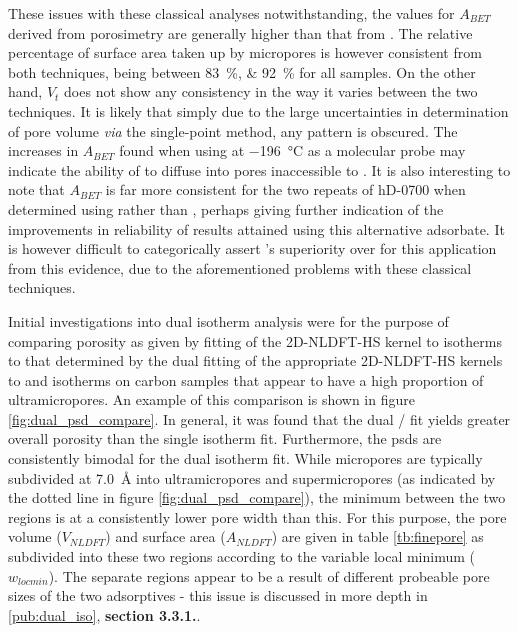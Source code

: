 These issues with these classical analyses notwithstanding, the values for $A_{BET}$ derived from  porosimetry are generally higher than that from . The relative percentage of surface area taken up by \glspl{micropore} is however consistent from both techniques, being between \qtylist[list-units=single]{83;92}{\percent} for all samples. On the other hand, $V_t$ does not show any consistency in the way it varies between the two techniques. It is likely that simply due to the large uncertainties in determination of pore volume \textit{via} the single-point method, any pattern is obscured. The increases in $A_{BET}$ found when using  at \qty{-196}{\degreeCelsius} as a molecular probe may indicate the ability of  to diffuse into pores inaccessible to . It is also interesting to note that $A_{BET}$ is far more consistent for the two repeats of hD-0700 when determined using  rather than , perhaps giving further indication of the improvements in reliability of results attained using this alternative \gls{adsorbate}. It is however difficult to categorically assert 's superiority over  for this application from this evidence, due to the aforementioned problems with these classical techniques. 
%

Initial investigations into dual isotherm analysis were for the purpose of comparing porosity as given by fitting of the 2D-NLDFT-HS kernel to  isotherms to that determined by the dual fitting of the appropriate 2D-NLDFT-HS kernels to  and  isotherms on carbon samples that appear to have a high proportion of \glspl{ultramicropore}. An example of this comparison is shown in figure \ref{fig:dual_psd_compare}. In general, it was found that the dual / fit yields greater overall porosity than the single isotherm fit. Furthermore, the \acrshort{psd}s are consistently bimodal for the dual isotherm fit. While \glspl{micropore} are typically subdivided at \qty{7.0}{\angstrom} into \glspl{ultramicropore} and \glspl{supermicropore} (as indicated by the dotted line in figure \ref{fig:dual_psd_compare}), the minimum between the two regions is at a consistently lower pore width than this. For this purpose, the pore volume ($V_{NLDFT}$) and surface area ($A_{NLDFT}$) are given in table \ref{tb:finepore} as subdivided into these two regions according to the variable local minimum ($w_{locmin}$). The separate regions appear to be a result of different probeable pore sizes of the two adsorptives - this issue is discussed in more depth in \ref{pub:dual_iso}, \textbf{section 3.3.1.}. 

